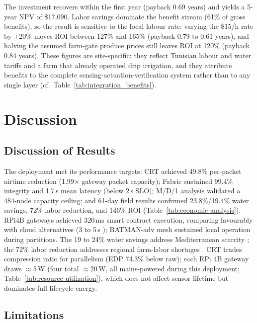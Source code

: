 \documentclass[pdflatex,sn-mathphys-num]{sn-jnl}
\theoremstyle{thmstyleone}
\theoremstyle{thmstyletwo}
\theoremstyle{thmstylethree}
\begin{document}
The investment recovers within the first year (payback 0.69 years) and yields a 5-year NPV of \$17,090. Labor savings dominate the benefit stream (61\% of gross benefits), so the result is sensitive to the local labour rate: varying the \$15/h rate by $\pm$20\% moves ROI between 127\% and 165\% (payback 0.79 to 0.61 years), and halving the assumed farm-gate produce prices still leaves ROI at 120\% (payback 0.84 years). These figures are site-specific: they reflect Tunisian labour and water tariffs and a farm that already operated drip irrigation, and they attribute benefits to the complete sensing-actuation-verification system rather than to any single layer (cf.\ Table~\ref{tab:integration_benefits}).

\section{Discussion}
\label{sec:discussion}

\subsection{Discussion of Results}
\label{subsec:objectives_achievement}

The deployment met its performance targets: CRT achieved 49.8\% per-packet airtime reduction (1.99$\times$ gateway packet capacity); Fabric sustained 99.4\% integrity and 1.7\,s mean latency (below 2\,s SLO); M/D/1 analysis validated a 484-node capacity ceiling; and 61-day field results confirmed 23.8\%/19.4\% water savings, 72\% labor reduction, and 146\% ROI (Table~\ref{tab:economic-analysis}). RPi4B gateways achieved 320\,ms smart contract execution, comparing favourably with cloud alternatives (3 to 5\,s \cite{liu2019edge}); BATMAN-adv mesh sustained local operation during partitions. The 19 to 24\% water savings address Mediterranean scarcity \cite{benali2024tunisiaWater,adeloye2021tunisiaAgro,brooks2019precisionWater,williams2022savings}; the 72\% labor reduction addresses regional farm-labor shortages \cite{miller2020climateImpact}. CRT trades compression ratio for parallelism (EDP 74.3\% below raw); each RPi 4B gateway draws $\approx$5\,W (four total $\approx$20\,W, all mains-powered during this deployment; Table~\ref{tab:resource-utilization}), which does not affect sensor lifetime but dominates full lifecycle energy.

\subsection{Limitations}
\label{subsec:limitations}
\end{document}
